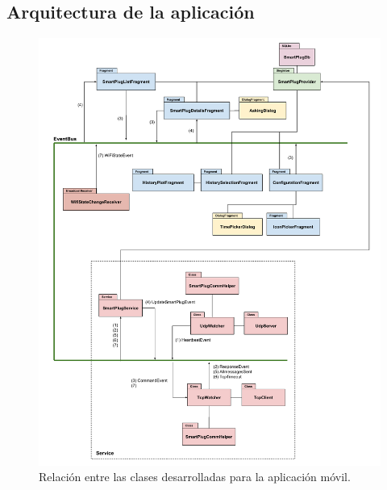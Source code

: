 \subsection{Arquitectura de la aplicación}

\begin{figure}[h]
	\centering
	\includegraphics[width=14cm]{./Figures/3_3_2_app-arquitectura.pdf}
	\caption{Relación entre las clases desarrolladas para la aplicación móvil.}
	\label{fig:app_arquitectura}
\end{figure}



